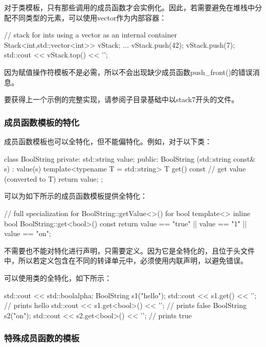 对于类模板，只有那些调用的成员函数才会实例化。因此，若需要避免在堆栈中分配不同类型的元素，可以使用vector作为内部容器：

\begin{cpp}
// stack for ints using a vector as an internal container
Stack<int,std::vector<int>> vStack;
...
vStack.push(42);
vStack.push(7);
std::cout << vStack.top() << '\n';
\end{cpp}

因为赋值操作符模板不是必需，所以不会出现缺少成员函数push\_front()的错误消息。

要获得上一个示例的完整实现，请参阅子目录基础中以stack7开头的文件。

\subsubsection{成员函数模板的特化}

成员函数模板也可以全特化，但不能偏特化。例如，对于以下类：

\begin{cpp}
class BoolString {
private:
	std::string value;
public:
	BoolString (std::string const& s)
	: value(s) {
	}
	template<typename T = std::string>
	T get() const { // get value (converted to T)
		return value;
	}
};
\end{cpp}

可以为如下所示的成员函数模板提供全特化：

\begin{cpp}
// full specialization for BoolString::getValue<>() for bool
template<>
inline bool BoolString::get<bool>() const {
	return value == "true" || value == "1" || value == "on";
}
\end{cpp}

不需要也不能对特化进行声明，只需要定义。因为它是全特化的，且位于头文件中，所以若定义包含在不同的转译单元中，必须使用内联声明，以避免错误。

可以使用类的全特化，如下所示：

\begin{cpp}
std::cout << std::boolalpha;
BoolString s1("hello");
std::cout << s1.get() << '\n'; // prints hello
std::cout << s1.get<bool>() << '\n'; // prints false
BoolString s2("on");
std::cout << s2.get<bool>() << '\n'; // prints true
\end{cpp}

\subsubsection{特殊成员函数的模板}

